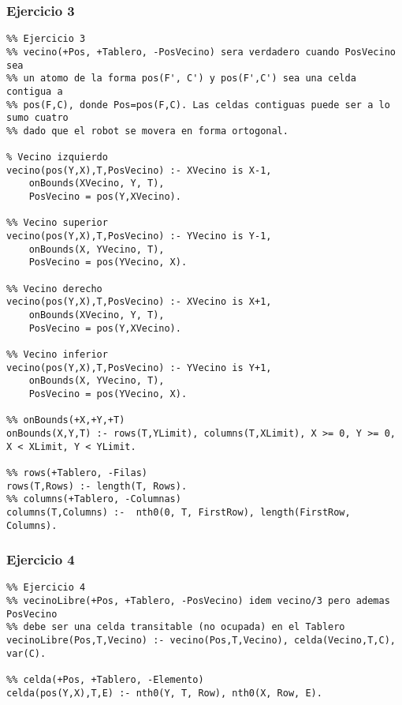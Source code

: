 \subsubsection*{Ejercicio 3}
\begin{lstlisting}
%% Ejercicio 3
%% vecino(+Pos, +Tablero, -PosVecino) sera verdadero cuando PosVecino sea
%% un atomo de la forma pos(F', C') y pos(F',C') sea una celda contigua a
%% pos(F,C), donde Pos=pos(F,C). Las celdas contiguas puede ser a lo sumo cuatro
%% dado que el robot se movera en forma ortogonal.

% Vecino izquierdo
vecino(pos(Y,X),T,PosVecino) :- XVecino is X-1,
	onBounds(XVecino, Y, T),
	PosVecino = pos(Y,XVecino).
	
%% Vecino superior
vecino(pos(Y,X),T,PosVecino) :- YVecino is Y-1,
	onBounds(X, YVecino, T),
	PosVecino = pos(YVecino, X).
	
%% Vecino derecho
vecino(pos(Y,X),T,PosVecino) :- XVecino is X+1,
	onBounds(XVecino, Y, T),
	PosVecino = pos(Y,XVecino).
	
%% Vecino inferior
vecino(pos(Y,X),T,PosVecino) :- YVecino is Y+1,
	onBounds(X, YVecino, T),
	PosVecino = pos(YVecino, X).

%% onBounds(+X,+Y,+T)
onBounds(X,Y,T) :- rows(T,YLimit), columns(T,XLimit), X >= 0, Y >= 0, X < XLimit, Y < YLimit.

%% rows(+Tablero, -Filas)
rows(T,Rows) :- length(T, Rows).
%% columns(+Tablero, -Columnas)
columns(T,Columns) :-  nth0(0, T, FirstRow), length(FirstRow, Columns).
\end{lstlisting}
\vspace{1cm}

\subsubsection*{Ejercicio 4}
\begin{lstlisting}
%% Ejercicio 4
%% vecinoLibre(+Pos, +Tablero, -PosVecino) idem vecino/3 pero ademas PosVecino
%% debe ser una celda transitable (no ocupada) en el Tablero
vecinoLibre(Pos,T,Vecino) :- vecino(Pos,T,Vecino), celda(Vecino,T,C), var(C).

%% celda(+Pos, +Tablero, -Elemento)
celda(pos(Y,X),T,E) :- nth0(Y, T, Row), nth0(X, Row, E).
\end{lstlisting}
\vspace{1cm}

